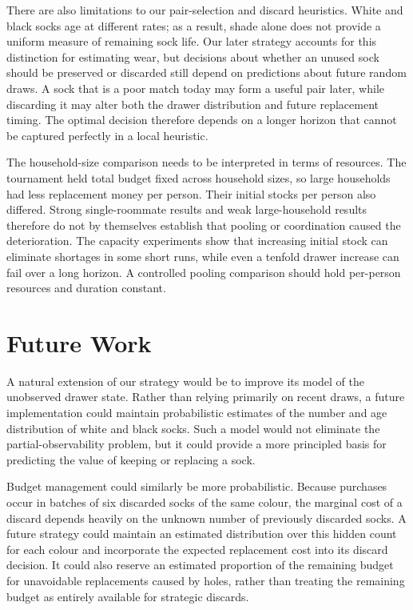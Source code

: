 \documentclass[11pt]{article}
\begin{document}
There are also limitations to our pair-selection and discard heuristics. White and black socks age at different rates; as a result, shade alone does not provide a uniform measure of remaining sock life. Our later strategy accounts for this distinction for estimating wear, but decisions about whether an unused sock should be preserved or discarded still depend on predictions about future random draws. A sock that is a poor match today may form a useful pair later, while discarding it may alter both the drawer distribution and future replacement timing. The optimal decision therefore depends on a longer horizon that cannot be captured perfectly in a local heuristic.

The household-size comparison needs to be interpreted in terms of resources. The tournament held total budget fixed across household sizes, so large households had less replacement money per person. Their initial stocks per person also differed. Strong single-roommate results and weak large-household results therefore do not by themselves establish that pooling or coordination caused the deterioration. The capacity experiments show that increasing initial stock can eliminate shortages in some short runs, while even a tenfold drawer increase can fail over a long horizon. A controlled pooling comparison should hold per-person resources and duration constant.

\section{Future Work}

A natural extension of our strategy would be to improve its model of the unobserved drawer state. Rather than relying primarily on recent draws, a future implementation could maintain probabilistic estimates of the number and age distribution of white and black socks. Such a model would not eliminate the partial-observability problem, but it could provide a more principled basis for predicting the value of keeping or replacing a sock.

Budget management could similarly be more probabilistic. Because purchases occur in batches of six discarded socks of the same colour, the marginal cost of a discard depends heavily on the unknown number of previously discarded socks. A future strategy could maintain an estimated distribution over this hidden count for each colour and incorporate the expected replacement cost into its discard decision. It could also reserve an estimated proportion of the remaining budget for unavoidable replacements caused by holes, rather than treating the remaining budget as entirely available for strategic discards.
\end{document}
